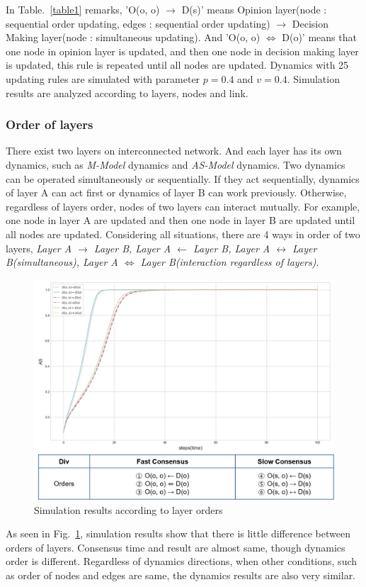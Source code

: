\documentclass[review]{elsarticle}
\begin{document}
In Table.~\ref{table1} remarks, 'O(o, o) $\to$ D(s)’ means Opinion layer(node : sequential order updating, edges : sequential order updating) $\to$ Decision Making layer(node : simultaneous updating). And 'O(o, o) $\Leftrightarrow$ D(o)’ means that one node in opinion layer is updated, and then one node in decision making layer is updated, this rule is repeated until all nodes are updated. Dynamics with 25 updating rules are simulated with parameter $p=0.4$ and $v=0.4$. Simulation results are analyzed according to layers, nodes and link. 
 
\subsubsection{Order of layers}
There exist two layers on interconnected network. And each layer has its own dynamics, such as \textit{M-Model} dynamics and \textit{AS-Model} dynamics. Two dynamics can be operated simultaneously or sequentially. If they act sequentially, dynamics of layer A can act first or dynamics of layer B can work previously. Otherwise, regardless of layers order, nodes of two layers can interact mutually. For example, one node in layer A are updated and then one node in layer B are updated until all nodes are updated.  
Considering all situations, there are 4 ways in order of two layers, \textit{Layer A $\to$ Layer B, Layer A $\leftarrow$ Layer B, Layer A $\leftrightarrow$ Layer B(simultaneous), Layer A $\Leftrightarrow$ Layer B(interaction regardless of layers)}. 
\begin{figure}[!htb]
	\centering
	\includegraphics[width=\hsize]{layerorder.png}
	\caption{Simulation results according to layer orders}
	\label{layerorder}
\end{figure}
As seen in Fig.~\ref{layerorder}, simulation results show that there is little difference between orders of layers. Consensus time and result are almost same, though dynamics order is different. Regardless of dynamics directions, when other conditions, such as order of nodes and edges are same, the dynamics results are also very similar.  
\end{document}
